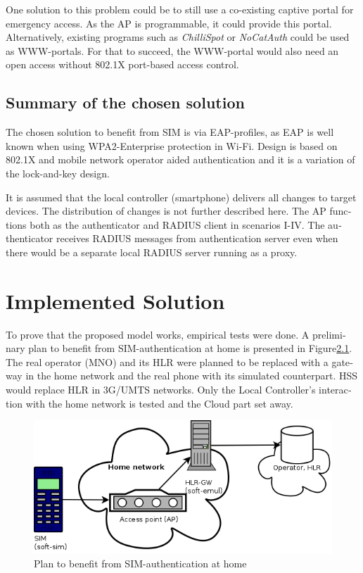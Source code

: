\documentclass[12pt,a4paper,english]{tutthesis}
\begin{document}
\begin{otherlanguage}{english}
One solution to this problem could be to still use a co-existing captive portal
for emergency access. As the AP is programmable, it could
provide this portal.  Alternatively, existing programs such as
\emph{ChilliSpot} or \emph{NoCatAuth} could be used as WWW-portals.  For that to
succeed, the WWW-portal would also need an open access without 802.1X
port-based access control.

\section{Summary of the chosen solution}
\label{sec-4-7}


The chosen solution to benefit from SIM is via EAP-profiles, as EAP
is well known when using WPA2-Enterprise protection in Wi-Fi.
Design is based on 802.1X and mobile network operator aided
authentication and it is a variation of the lock-and-key design.

It is assumed that  the local controller (smartphone)
delivers all changes to target devices.
The distribution of changes \cite{silverajan2015collaborative} is not
further described here.  The AP functions both as the authenticator
and RADIUS client in scenarios I-IV.  The authenticator receives RADIUS
messages from authentication server even when there would be a
separate local RADIUS server running as a proxy.



\chapter{Implemented Solution}
\label{sec-5}


To prove that the proposed model works, empirical tests were done.
A preliminary plan to benefit from SIM-authentication at home is
presented in Figure\ref{fig:sim-pre}. The real operator (MNO) and its HLR were 
planned to be replaced with a gateway in the home network and the real phone
with its simulated counterpart. HSS would replace HLR in 3G/UMTS
networks. 
Only the Local Controller's interaction with the home network is
tested and the Cloud part set away.

\begin{figure}[htb]
\centering
\includegraphics[width=.9\linewidth]{phone-soft-hlr.png}
\caption{\label{fig:sim-pre}Plan to benefit from SIM-authentication at home}
\end{figure}


\end{otherlanguage}
\end{document}

